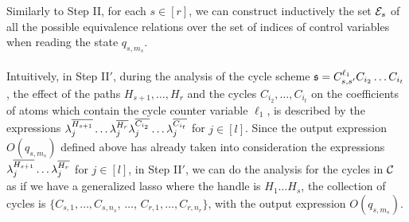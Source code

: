 Similarly to Step II, for each $s \in [r]$, we can construct inductively the set ${\mathcal{E} }_s$ of all the possible equivalence relations over the set of indices of control variables when reading the state $q_{s, m_s}$.
\bigskip\\
\medskip\\
Intuitively, in Step II$'$, during the analysis of the cycle scheme ${\mathfrak{s} } = C^{\ell_1}_{s,s'} C_{i_{2}} \dots C_{i_{t}}$, the effect of the paths $H_{s+1},  \dots,  H_r$ and the cycles $C_{i_{2}}, \dots, C_{i_{t}}$ on the coefficients of atoms which contain the cycle counter variable $\ell_1$, is described by the expressions  $\lambda^{\overline{H_{s+1}}}_j \dots \lambda^{\overline{H_{r}}}_j  \lambda^{\overline{C_{i_{2}}}}_j \dots \lambda^{\overline{C_{i_{t}}}}_j $ for $j \in [l]$. Since the output expression $O(q_{s, m_{s}})$ defined above has already taken into consideration the expressions $\lambda^{\overline{H_{s+1}}}_j \dots \lambda^{\overline{H_{r}}}_j$ for $j \in [l]$, in Step II$'$, we can do the analysis for the cycles in ${\mathcal{C} }$ as if we have a generalized lasso where the handle is $H_1\dots H_s$, the collection of cycles is $\{C_{s,1},\dots, C_{s,n_s}$, $\dots$, $C_{r,1},\dots, C_{r,n_r}\}$, with the output expression  $O(q_{s, m_{s}})$.
\hide
